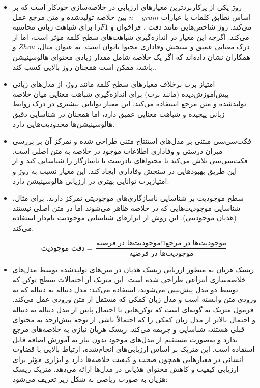 \begin{itemize}
	\item روژ
	 یکی از پرکاربردترین معیارهای ارزیابی در خلاصه‌سازی خودکار است که بر اساس تطابق کلمات یا عبارات $n-gram$ بین خلاصه تولیدشده و متن مرجع عمل می‌کند. روژ شاخص‌هایی مانند دقت  ، فراخوان  و $F1 $را برای شباهت زبانی محاسبه می‌کند. اگرچه این معیار در اندازه‌گیری شباهت‌های سطح کلمه مؤثر است، اما از درک معنایی عمیق و سنجش وفاداری محتوا ناتوان است. به عنوان مثال، $Zhou$ و همکاران نشان داده‌اند که اگر یک خلاصه شامل مقدار زیادی محتوای هالوسینیشن باشد، ممکن است همچنان روژ بالایی کسب کند.\cite{zhou-etal-2021-detecting,lin-2004-rouge}.
	\item 
	امتیاز برت برخلاف معیارهای سطح کلمه مانند روژ، از مدل‌های زبانی پیش‌آموزش‌دیده (مانند برت) برای اندازه‌گیری شباهت معنایی میان خلاصه تولیدشده و متن مرجع استفاده می‌کند. این معیار توانایی بیشتری در درک روابط زبانی پیچیده و شباهت معنایی عمیق دارد، اما همچنان در شناسایی دقیق هالوسینیشن‌ها محدودیت‌هایی دارد\cite{zhang-etal-2024-benchmarking}.
	\item 
	فکت‌سی‌سی مبتنی بر مدل‌های استنتاج متنی طراحی شده و تمرکز آن بر بررسی میزان درستی و وفاداری اطلاعات موجود در خلاصه به متن اصلی است. فکت‌سی‌سی تلاش می‌کند تا محتواهای نادرست یا ناسازگار را شناسایی کند و از این طریق بهبودهایی در سنجش وفاداری ایجاد کند. این معیار نسبت به روژ و امتیازبرت توانایی بهتری در ارزیابی هالوسینیشن دارد\cite{factcc-etal-2020-evaluating}.
	
	\item 
	سطح موجودیت
	بر شناسایی ناسازگاری‌های موجودیتی تمرکز دارند. برای مثال، شناسایی موجودیت‌هایی که در خلاصه ظاهر می‌شوند اما در متن اصلی نیستند (هذیان موجودیتی). این روش  از ابزارهای شناسایی موجودیت نام‌دار استفاده می‌کند\cite{nan_entity-level_2021}.

	\begin{equation}
		\text{دقت موجودیت} = \frac{\text{موجودیت‌ها در فرضیه} \cap \text{موجودیت‌ها در مرجع}}{\text{موجودیت‌ها در فرضیه}}
	\end{equation}
	
	
	
	\item {
	ریسک هزیان 
	به منظور ارزیابی ریسک هذیان در متن‌های تولیدشده توسط مدل‌های خلاصه‌سازی انتزاعی طراحی شده است. این متریک از احتمالات سطح توکن که توسط دو مدل پیش‌بینی می‌شوند، استفاده می‌کند: مدل دنباله به دنباله که به ورودی متن وابسته است و مدل زبان کمکی که مستقل از متن ورودی عمل می‌کند. فرمول متریک به گونه‌ای است که توکن‌هایی با احتمال پایین از مدل دنباله به دنباله و احتمال بالاتر از مدل زبان کمکی را که احتمالاً ناشی از توجه بیش‌ازحد به محتوای قبلی هستند، شناسایی و جریمه می‌کند. ریسک هزیان نیازی به خلاصه‌های مرجع ندارد و به‌صورت مستقیم از مدل‌های موجود بدون نیاز به آموزش اضافه قابل استفاده است. این متریک بر اساس ارزیابی‌های انجام‌شده، ارتباط بالایی با قضاوت انسانی در معیارهایی همچون صحت و کیفیت خلاصه‌ها دارد و ابزاری مؤثر برای ارزیابی کیفیت و کاهش محتوای هذیانی در مدل‌ها ارائه می‌دهد. 
	متریک ریسک هزیان  به صورت ریاضی به شکل زیر تعریف می‌شود:
	

}
\end{itemize}
